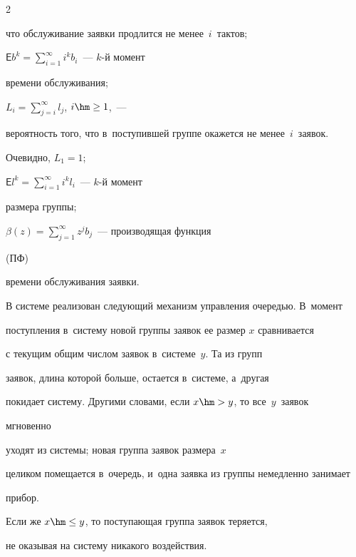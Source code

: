 \begin{multicols}{2}
\begin{description}
что обслуживание заявки продлится не менее~$i$~тактов;


\item[\,]


$\mathsf{E}b^k=\sum\nolimits_{i=1}^\infty i^k b_i$~--- $k$-й момент 


времени обслуживания;


\item[\,]


$L_i =\sum\nolimits_{j=i}^\infty l_j$, $i\hm\ge 1$,~---


вероятность того, что в~поступившей группе окажется не менее~$i$~заявок.


Очевидно, $L_1=1$;  


\item[\,]





$\mathsf{E}l^k=\sum\nolimits_{i=1}^\infty i^k l_i$~--- $k$-й момент 


размера группы;


\item[\,]


$\beta(z)=\sum\nolimits_{j=1}^\infty z^j b_j$~--- производящая функция 


(ПФ)


времени обслуживания заявки.


\end{description}








В системе реализован следующий механизм управления очередью. В~момент


поступления в~сис\-те\-му новой группы заявок ее размер $x$ сравнивается


с текущим общим числом заявок в~системе~$y$. Та из групп


заявок, длина которой больше, остается в~системе, а~другая


покидает систему. Другими словами, если $x\hm>y$, то все~$y$~заявок 


мгновенно


уходят из системы; новая группа заявок размера~$x$


целиком помещается в~очередь, и~одна заявка из группы немедленно занимает 


прибор.


Если же $x \hm\le y$, то поступающая группа заявок теряется,


не оказывая на систему никакого воздействия.






\end{multicols}
